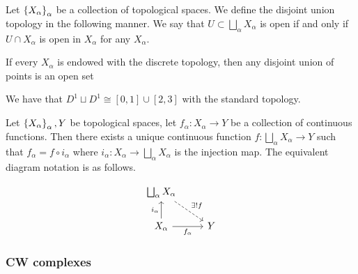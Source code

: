 \documentclass[11pt,a4paper]{article}
\begin{document}
\begin{definition}
  Let $\left\{X_{\alpha}\right\}_{\alpha}$ be a collection of topological spaces.
  We define the disjoint union topology in the following manner.
  We say that $U \subset \bigsqcup_{\alpha} X_{\alpha}$ is open if and only
  if $U \cap X_{\alpha}$ is open in $X_{\alpha}$ for any $X_{\alpha}$.
\end{definition}

\begin{example}
  If every $X_{\alpha}$ is endowed with the discrete topology,
  then any disjoint union of points is an open set 
\end{example}

\begin{example}
  We have that $D^1 \sqcup D^1 \cong [0,1] \cup [2,3]$ with the standard
  topology.
\end{example}

\begin{proposition}
  Let $\left\{X_{\alpha}\right\}_{\alpha}, Y$ be topological spaces,
  let $f_{\alpha} \colon X_{\alpha} \to Y$ be a collection of continuous
  functions.
  Then there exists a unique continuous function 
  $f \colon \bigsqcup_{\alpha} X_{\alpha} \to Y$ such that
  $f_{\alpha} = f \circ i_{\alpha}$ where $i_{\alpha} \colon X_{\alpha} \to
  \bigsqcup_{\alpha} X_{\alpha}$ is the injection map.
  The equivalent diagram notation is as follows.
  \begin{center}
    \[
    \begin{tikzcd}
      \bigsqcup_{\alpha} X_{\alpha} \arrow[rd, "\exists !f", dashed] &   \\
      X_{\alpha} \arrow[u, "i_{\alpha}"] \arrow[r, "f_{\alpha}"']         & Y
    \end{tikzcd}
    \]
  \end{center}
\end{proposition}

\subsubsection{CW complexes}
\end{document}
